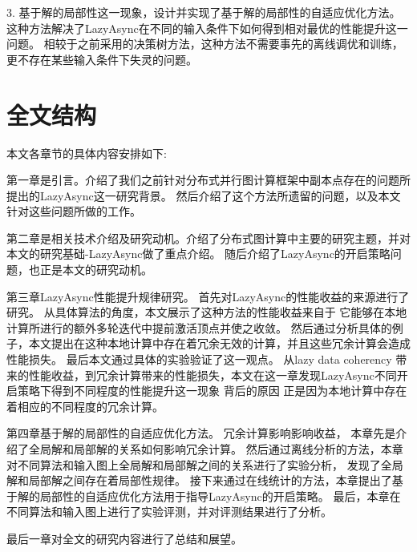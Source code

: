 3. 基于解的局部性这一现象，设计并实现了基于解的局部性的自适应优化方法。
这种方法解决了LazyAsync在不同的输入条件下如何得到相对最优的性能提升这一问题。
相较于之前采用的决策树方法，这种方法不需要事先的离线调优和训练，更不存在某些输入条件下失灵的问题。




\section{全文结构}
本文各章节的具体内容安排如下:

第一章是引言。介绍了我们之前针对分布式并行图计算框架中副本点存在的问题所提出的LazyAsync这一研究背景。
然后介绍了这个方法所遗留的问题，以及本文针对这些问题所做的工作。

第二章是相关技术介绍及研究动机。介绍了分布式图计算中主要的研究主题，并对本文的研究基础-LazyAsync做了重点介绍。
随后介绍了LazyAsync的开启策略问题，也正是本文的研究动机。

第三章LazyAsync性能提升规律研究。
首先对LazyAsync的性能收益的来源进行了研究。
从具体算法的角度，本文展示了这种方法的性能收益来自于 它能够在本地计算所进行的额外多轮迭代中提前激活顶点并使之收敛。
然后通过分析具体的例子，本文提出在这种本地计算中存在着冗余无效的计算，并且这些冗余计算会造成性能损失。
最后本文通过具体的实验验证了这一观点。
从lazy data coherency 带来的性能收益，到冗余计算带来的性能损失，本文在这一章发现LazyAsync不同开启策略下得到不同程度的性能提升这一现象
背后的原因
正是因为本地计算中存在着相应的不同程度的冗余计算。

第四章基于解的局部性的自适应优化方法。
冗余计算影响影响收益，
本章先是介绍了全局解和局部解的关系如何影响冗余计算。
然后通过离线分析的方法，本章对不同算法和输入图上全局解和局部解之间的关系进行了实验分析，
发现了全局解和局部解之间存在着局部性规律。
接下来通过在线统计的方法，本章提出了基于解的局部性的自适应优化方法用于指导LazyAsync的开启策略。
最后，本章在不同算法和输入图上进行了实验评测，并对评测结果进行了分析。

最后一章对全文的研究内容进行了总结和展望。




